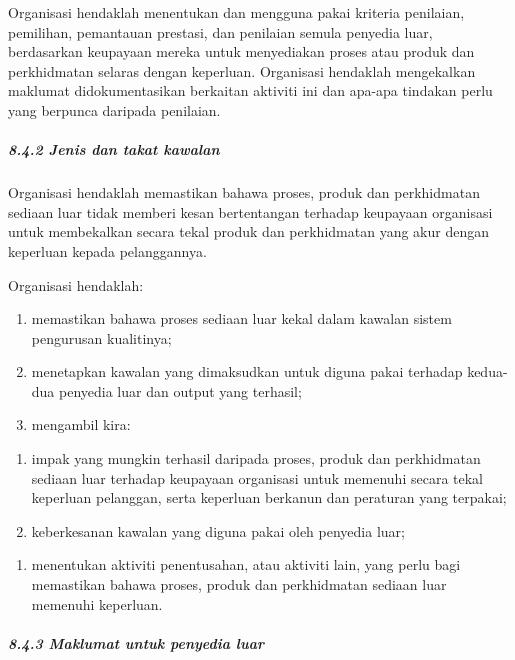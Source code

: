 \documentclass[
]{article}
\providecommand{\tightlist}{%
  \setlength{\itemsep}{0pt}\setlength{\parskip}{0pt}}
\begin{document}
Organisasi hendaklah menentukan dan mengguna pakai kriteria penilaian,
pemilihan, pemantauan prestasi, dan penilaian semula penyedia luar,
berdasarkan keupayaan mereka untuk menyediakan proses atau produk dan
perkhidmatan selaras dengan keperluan. Organisasi hendaklah mengekalkan
maklumat didokumentasikan berkaitan aktiviti ini dan apa-apa tindakan
perlu yang berpunca daripada penilaian.

\hypertarget{jenis-dan-takat-kawalan}{%
\subparagraph{8.4.2 Jenis dan takat
kawalan}\label{jenis-dan-takat-kawalan}}

Organisasi hendaklah memastikan bahawa proses, produk dan perkhidmatan
sediaan luar tidak memberi kesan bertentangan terhadap keupayaan
organisasi untuk membekalkan secara tekal produk dan perkhidmatan yang
akur dengan keperluan kepada pelanggannya.

Organisasi hendaklah:

\begin{enumerate}
\def\labelenumi{\alph{enumi})}
\item
  memastikan bahawa proses sediaan luar kekal dalam kawalan sistem
  pengurusan kualitinya;
\item
  menetapkan kawalan yang dimaksudkan untuk diguna pakai terhadap
  kedua-dua penyedia luar dan output yang terhasil;
\item
  mengambil kira:
\end{enumerate}

\begin{enumerate}
\def\labelenumi{\arabic{enumi})}
\item
  impak yang mungkin terhasil daripada proses, produk dan perkhidmatan
  sediaan luar terhadap keupayaan organisasi untuk memenuhi secara tekal
  keperluan pelanggan, serta keperluan berkanun dan peraturan yang
  terpakai;
\item
  keberkesanan kawalan yang diguna pakai oleh penyedia luar;
\end{enumerate}

\begin{enumerate}
\def\labelenumi{\alph{enumi})}
\setcounter{enumi}{3}
\tightlist
\item
  menentukan aktiviti penentusahan, atau aktiviti lain, yang perlu bagi
  memastikan bahawa proses, produk dan perkhidmatan sediaan luar
  memenuhi keperluan.
\end{enumerate}

\hypertarget{maklumat-untuk-penyedia-luar}{%
\subparagraph{8.4.3 Maklumat untuk penyedia
luar}\label{maklumat-untuk-penyedia-luar}}
\end{document}
